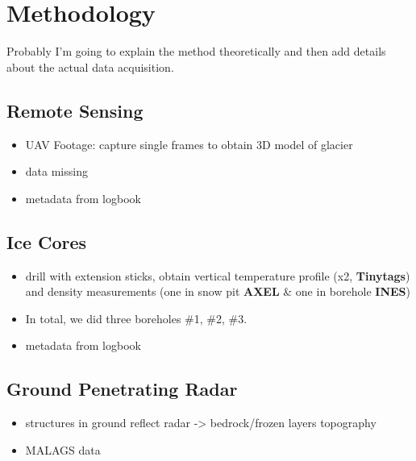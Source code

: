 \section{Methodology}


Probably I'm going to explain the method theoretically and then add details about the actual data acquisition.

\subsection{Remote Sensing}

\begin{itemize}
	\item UAV Footage: capture single frames to obtain 3D model of glacier
	\item data missing
	\item metadata from logbook
\end{itemize}

\subsection{Ice Cores}

\begin{itemize}
	\item drill with extension sticks, obtain vertical temperature profile (x2, \textbf{Tinytags}) and density measurements (one in snow pit \textbf{AXEL} \& one in borehole \textbf{INES})
	\item In total, we did three boreholes \#1, \#2, \#3.
	\item metadata from logbook
\end{itemize}

\subsection{Ground Penetrating Radar}

\begin{itemize}
	\item structures in ground reflect radar -> bedrock/frozen layers topography
	\item MALAGS data
\end{itemize}